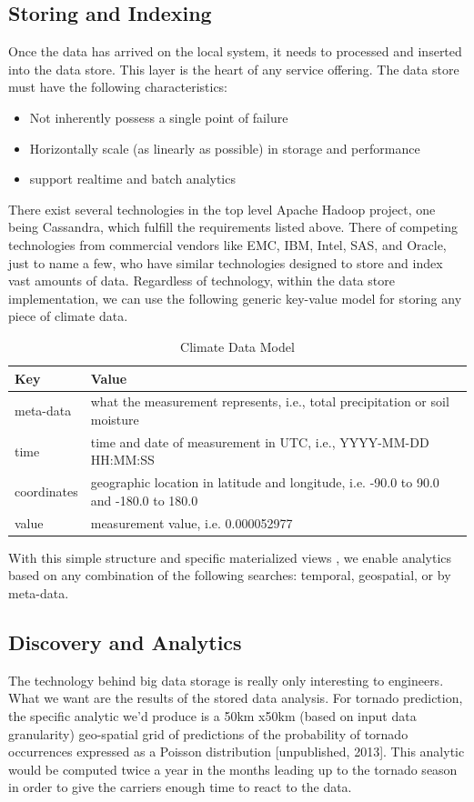 \subsection{Storing and Indexing}
Once the data has arrived on the local system, it needs to processed and inserted into the data store. This layer is the heart of any service offering. The data store must have the following characteristics:
\begin{itemize}
	\item Not inherently possess a single point of failure
	\item Horizontally scale (as linearly as possible) in storage and performance
	\item support realtime and batch analytics
\end{itemize}
There exist several technologies in the top level Apache Hadoop project, one being Cassandra, which fulfill the requirements listed above\cite{cassandra}. There of competing technologies from commercial vendors like EMC, IBM, Intel, SAS, and Oracle, just to name a few, who have similar technologies designed to store and index vast amounts of data. Regardless of technology, within the data store implementation, we can use the following generic key-value model for storing any piece of climate data.
\begin{table}[htbp]
	\caption*{Climate Data Model}
	\centering
	\begin{tabular}{l l}
		\hline
		Key & Value \\ [0.5ex]
		\hline
		meta-data & what the measurement represents, i.e., total precipitation or soil moisture\\
		time & time and date of measurement in UTC, i.e., YYYY-MM-DD HH:MM:SS\\
		coordinates & geographic location in latitude and longitude, i.e. -90.0 to 90.0 and -180.0 to 180.0\\
		value & measurement value, i.e. 0.000052977\\
		\hline
	\end{tabular}
\end{table}
With this simple structure and specific materialized views \cite{materialized_views}, we enable analytics based on any combination of the following searches: temporal, geospatial, or by meta-data.

\subsection{Discovery and Analytics}
The technology behind big data storage is really only interesting to engineers. What we want are the results of the stored data analysis. For tornado prediction, the specific analytic we'd produce is a 50km x50km (based on input data granularity) geo-spatial grid of predictions of the probability of tornado occurrences expressed as a Poisson distribution [unpublished, 2013]. This analytic would be computed twice a year in the months leading up to the tornado season in order to give the carriers enough time to react to the data.

